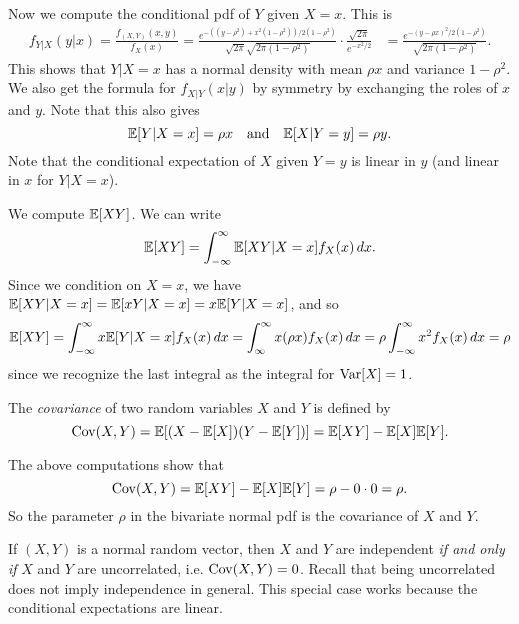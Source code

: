 \begin{example}
  Now we compute the conditional pdf of $Y$
  given $X = x$. This is
  \begin{align*}
    f_{Y | X}(y | x)
    = \frac{f_{(X, Y)}(x, y)}{f_X(x)}
    = \frac{e^{-((y - \rho^2) + x^2(1 - \rho^2)) / 2(1 - \rho^2)}}{\sqrt{2\pi} \sqrt{2\pi (1 - \rho^2)}} 
    \cdot \frac{\sqrt{2\pi}}{e^{-x^2 / 2}}
    &= \frac{e^{-(y - \rho x)^2 / 2(1 - \rho^2)}}{\sqrt{2\pi(1 - \rho^2)}}.
  \end{align*}
  This shows that $Y | X = x$ has a normal
  density with mean $\rho x$ and variance $1 - \rho^2$.
  We also get the formula for $f_{X | Y}(x | y)$
  by symmetry by exchanging the roles of $x$ and $y$.
  Note that this also gives
  \[
    \mathbb{E}[Y | X = x] = \rho x \quad \text{and} \quad
    \mathbb{E}[X | Y = y] = \rho y.
  \]
  Note that the conditional expectation of
  $X$ given $Y = y$ is linear in $y$ (and linear
  in $x$ for $Y | X = x$).
\end{example}

\begin{example}
  We compute $\mathbb{E}[XY]$. We can write
  \[
    \mathbb{E}[XY] = \int_{-\infty}^\infty \mathbb{E}[XY | X = x] f_X(x)\, dx.
  \]
  Since we condition on $X = x$, we have
  $\mathbb{E}[XY | X = x] = \mathbb{E}[xY | X = x] = x \mathbb{E}[Y | X = x]$, and so
  \[
    \mathbb{E}[XY] = \int_{-\infty}^\infty x \mathbb{E}[Y | X = x] f_X(x)\, dx
    = \int_{\infty}^\infty x (\rho x) f_X(x)\, dx
    = \rho \int_{-\infty}^\infty x^2 f_X(x)\, dx
    = \rho
  \]
  since we recognize the last integral as
  the integral for $\operatorname{Var}[X] = 1$.
\end{example}

\begin{definition}
  The \emph{covariance} of two random variables
  $X$ and $Y$ is
  defined by
  \[
    \operatorname{Cov}(X, Y)
    = \mathbb{E}[(X - \mathbb{E}[X])(Y - \mathbb{E}[Y])]
    = \mathbb{E}[XY] - \mathbb{E}[X] \mathbb{E}[Y].
  \]
\end{definition}

\begin{remark}
  The above computations show that
  \[
    \operatorname{Cov}(X, Y) = \mathbb{E}[XY] - \mathbb{E}[X] \mathbb{E}[Y] = \rho - 0 \cdot 0 = \rho.
  \]
  So the parameter $\rho$ in the bivariate normal
  pdf is the covariance of $X$ and $Y$.
\end{remark}

\begin{remark}
  If $(X, Y)$ is a normal random vector, then
  $X$ and $Y$ are independent \emph{if and only if}
  $X$ and $Y$ are uncorrelated, i.e. $\operatorname{Cov}(X, Y) = 0$.
  Recall that being uncorrelated does not
  imply independence in general. This special case
  works because the conditional expectations are
  linear.
\end{remark}

